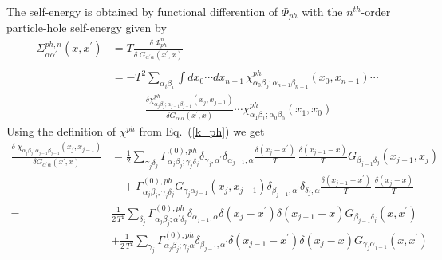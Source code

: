 The self-energy is obtained by functional differention
of $\Phi_{ph}$ with the $n^{th}$-order particle-hole self-energy
given by
\begin{equation}
\label{sigma_ph1}
\begin{split}
\Sigma^{ph,n}_{\alpha \alpha^{\prime}}(x,x^{\prime}) & = 
T \frac{\delta\; \Phi_{ph}^n}
{\delta\; G_{\alpha^{\prime} \alpha}(x^{\prime},x)} \\
\\
& = -T^{2} \sum_{\alpha_i \beta_i}
 \int dx_0 \cdots dx_{n-1} \,
 \chi^{ph}_{\alpha_0 \beta_0; \alpha_{n-1} \beta_{n-1}}(x_0, x_{n-1}) 
 \cdots \\
& \quad \quad \quad \frac{\delta   
 \chi^{ph}_{\alpha_j \beta_j; \alpha_{j-1} \beta_{j-1}}(x_j, x_{j-1})}
 {\delta G_{\alpha^{\prime} \alpha}(x^{\prime},x)}
 \cdots
 \chi^{ph}_{\alpha_1 \beta_1; \alpha_0 \beta_0}(x_1,x_0) 
\end{split}
\end{equation}
Using the definition of $\chi^{ph}$ from Eq.~(\ref{k_ph}) we
get
\begin{equation}
\label{deriv_kph}
\begin{split}
\frac{\delta\; \chi_{\alpha_j \beta_j; \alpha_{j-1} \beta_{j-1}}(x_j, x_{j-1})}
{\delta G_{\alpha^{\prime} \alpha}(x^{\prime},x)} & = 
\frac{1}{2} \sum_{\gamma_j \delta_j} 
        \Gamma^{(0),ph}_{ \alpha_j \beta_j;\gamma_j\delta_j}
 \delta_{\gamma_j,\alpha^{\prime}}
                           \delta_{\alpha_{j-1},\alpha}
  \frac{ \delta(x_j - x^{\prime})}{T}\,
 \frac{\delta(x_{j-1} - x)}{T}
                           G_{\beta_{j-1}\delta_j}(x_{j-1},x_j) 
\\
& \quad + 
 \Gamma^{(0),ph}_{ \alpha_j \beta_j;\gamma_j\delta_j}
G_{\gamma_j \alpha_{j-1}}(x_j,x_{j-1})
                          \delta_{\beta_{j-1},\alpha^{\prime}}
                          \delta_{\delta_j,\alpha}
             \frac{\delta(x_{j-1} - x^{\prime})}{T}\,
                     \frac{\delta(x_j - x)}{T}
 \\
= &  \frac{1}{2\, T^2}
\sum_{\delta_j} 
 \Gamma^{(0),ph}_{\alpha_j \beta_j; \alpha^{\prime}\delta_j}
\delta_{\alpha_{j-1},\alpha} 
                      \delta(x_j - x^{\prime})
                      \delta(x_{j-1} - x) G_{\beta_{j-1}\delta_j}(x,x^{\prime})
\\
& + \frac{1}{2\, T^2}
\sum_{\gamma_j} 
 \Gamma^{(0),ph}_{\alpha_j\beta_j; \gamma_j \alpha }
\delta_{\beta_{j-1},\alpha^{\prime}}
                    \delta(x_{j-1} - x^{\prime}) 
                    \delta(x_j - x)
                    G_{\gamma_j \alpha_{j-1}}(x,x^{\prime})
\end{split}
\end{equation}
